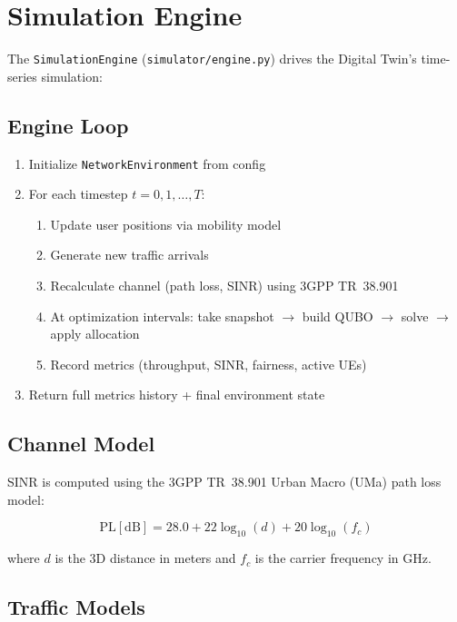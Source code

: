 \documentclass[11pt,a4paper]{article}
\begin{document}
\section{Simulation Engine}

The \texttt{SimulationEngine} (\texttt{simulator/engine.py}) drives the Digital Twin's time-series simulation:

\subsection{Engine Loop}

\begin{enumerate}
  \item Initialize \texttt{NetworkEnvironment} from config
  \item For each timestep $t = 0, 1, \ldots, T$:
    \begin{enumerate}
      \item Update user positions via mobility model
      \item Generate new traffic arrivals
      \item Recalculate channel (path loss, SINR) using 3GPP TR~38.901
      \item At optimization intervals: take snapshot $\to$ build QUBO $\to$ solve $\to$ apply allocation
      \item Record metrics (throughput, SINR, fairness, active UEs)
    \end{enumerate}
  \item Return full metrics history + final environment state
\end{enumerate}

\subsection{Channel Model}

SINR is computed using the 3GPP TR~38.901 Urban Macro (UMa) path loss model:

$$\text{PL}[\text{dB}] = 28.0 + 22 \log_{10}(d) + 20 \log_{10}(f_c)$$

where $d$ is the 3D distance in meters and $f_c$ is the carrier frequency in GHz.

\subsection{Traffic Models}
\end{document}
